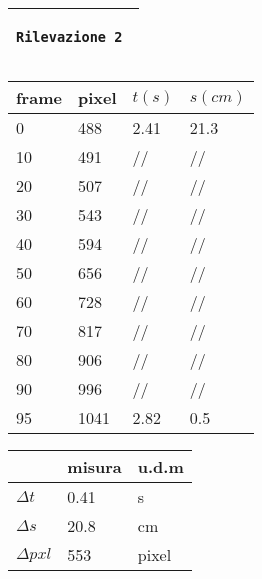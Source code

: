 \documentclass{article}
\begin{document}
\newpage
\begin{center}
\begin{tabular}{|m{15em}|}
	\hline
	
	\begin{center}
		\texttt \bf \large Rilevazione 2
	\end{center} \\
	\hline
\end{tabular}

\vspace{15pt}

\begin{tabular}{ | m{3em} | m{3em} | m{2.5em}| m{2.5em} | } 
 \hline
 \vspace{5pt} frame \vspace{5pt}  &  pixel & $t(s)$ & $s(cm)$\\ 
 \hline
 \hline
 0 & 488 & 2.41  & 21.3\\ 
 \hline
 10 & 491 & //  & //\\
 \hline
 20 & 507 & //  & //\\ 
 \hline
 30 & 543 & //  & //\\ 
 \hline
 40 & 594 & //  & //\\ 
 \hline
 50 & 656 & //  & //\\ 
 \hline
 60 & 728 & //  & //\\ 
 \hline
 70 & 817 & //  & //\\ 
 \hline
 80 & 906 & //  & //\\ 
 \hline
 90 & 996 & //  & //\\ 
 \hline
 95 & 1041 & 2.82  & 0.5\\ 
 \hline
\end{tabular}

\vspace{5pt}

\begin{tabular}{ | m{3em} | m{3em} | m{1cm}| } 
 \hline
   &  misura & u.d.m \\ 
 \hline
 \hline
 $\Delta t$   &  0.41 	& s\\
 \hline
 $\Delta s$   &  20.8	& cm\\
 \hline
 $\Delta pxl$ & 553	& pixel\\
 \hline
\end{tabular}
\end{center}


\end{document}
